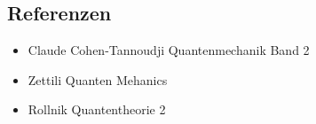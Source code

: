 
\usepackage{amsmath} 





\section*{}








\subsection*{Referenzen}
\begin{itemize}
\item Claude Cohen-Tannoudji Quantenmechanik Band 2
\item Zettili Quanten Mehanics
\item Rollnik Quantentheorie 2
\end{itemize}



